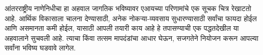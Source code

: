 आंतरराष्ट्रीय नाणेनिधीचा हा अहवाल जागतिक भविष्यावर एआयच्या परिणामांचे एक सूचक चित्र रेखाटतो आहे. आर्थिक विकासाला चालना देण्यासाठी, अनेक नोकऱ्या-व्यवसाय सुधारण्यासाठी सर्वांचा फायदा होईल आणि असमानता कमी होईल, यासाठी आपली तयारी काय आहे हे तपासण्याची एक पद्धतदेखील या अहवालाने सुचवली आहे. त्याचा किंवा तत्सम मापदंडांचा आधार घेऊन, सजगतेने नियोजन करून आपल्या सर्वांना भविष्य घडवावे लागेल.

